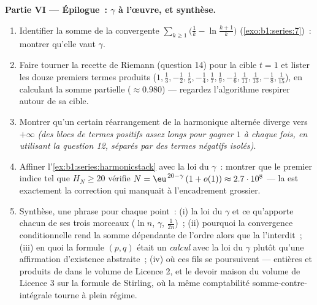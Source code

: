 \begin{problem}[{Devoir maison --- $H_n = \ln n + \gamma +
\frac{1}{2n} + O(n^{-2})$, et le réarrangement de $1 - \frac12 +
\frac13 - \dots$ en $\frac{\ln 2}{2}$}]
\medskip
\noindent\textbf{Partie VI --- Épilogue~: $\gamma$ à l'œuvre, et
synthèse.}
\begin{enumerate}[resume]
  \item Identifier la somme de la  convergente
        $\sum_{k\geq1} \bigl(\frac1k - \ln\frac{k+1}{k}\bigr)$
        (\cref{exo:b1:series:7})~: montrer qu'elle vaut $\gamma$.
  \item Faire tourner la recette de Riemann (question 14) pour la
        cible $t = 1$ et lister les douze premiers termes produits
        ($1, \frac13, -\frac12, \frac15, -\frac14, \frac17,
        \frac19, -\frac16, \frac1{11}, \frac1{13}, -\frac18,
        \frac1{15}$), en calculant la somme partielle ($\approx
        0.980$) --- regardez l'algorithme respirer autour de sa cible.
  \item Montrer qu'un certain réarrangement de la  harmonique
        alternée diverge vers $+\infty$ \emph{(des blocs de termes
        positifs assez longs pour gagner $1$ à chaque fois, en
        utilisant la question 12, séparés par des termes négatifs
        isolés)}.
  \item Affiner l'\cref{ex:b1:series:harmonicstack} avec la loi du
        $\gamma$~: montrer que le premier indice tel que $H_N \geq
        20$ vérifie $N = \eu^{\,20 - \gamma}\,(1 + o(1))
        \approx 2.7\cdot10^{8}$ --- la  est
        exactement la correction qui manquait à l'encadrement
        grossier.
  \item Synthèse, une phrase pour chaque point~: (i) la loi du
        $\gamma$ et ce qu'apporte chacun de ses trois morceaux
        ($\ln n$, $\gamma$, $\frac{1}{2n}$)~; (ii) pourquoi la
        convergence conditionnelle rend la somme dépendante de
        l'ordre alors que la  l'interdit~; (iii)
        en quoi la formule $(p,q)$ était un \emph{calcul} avec la loi
        du $\gamma$ plutôt qu'une affirmation d'existence abstraite~;
        (iv) où ces fils se poursuivent ---  entières et
        produits de  dans le volume de Licence 2, et le devoir
        maison du volume de Licence 3 sur la formule de Stirling, où
        la même comptabilité somme-contre-intégrale tourne à plein
        régime.
\end{enumerate}
\end{problem}
